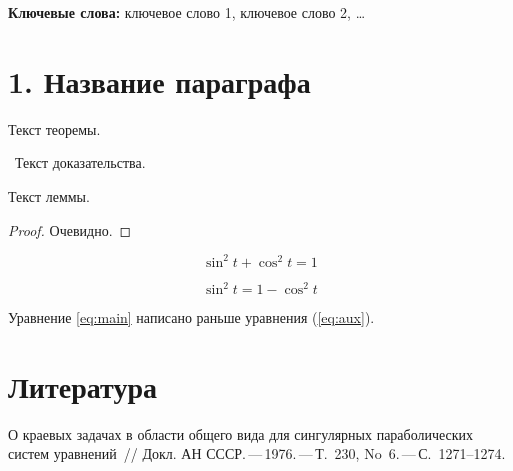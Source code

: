 










{\noindent\footnotesize{\bf Ключевые
 слова:} ключевое слово 1, ключевое слово 2, \ldots\par}



\section*{1. Название параграфа}



Текст теоремы. \Endproc

\beginproof~Текст доказательства.~\endproof


Текст леммы.\Endproc




\begin{proof}
Очевидно.
\end{proof}


\begin{equation}
	\label{eq:main}
	\sin^2 t + \cos^2 t = 1
\end{equation}

\begin{equation}
	\label{eq:aux}
	\sin^2 t = 1 - \cos^2 t
\end{equation}

Уравнение \eqref{eq:main} написано раньше уравнения (\ref{eq:aux}).










\section*{Литература}

\begin{enumerate}
 {\footnotesize
 \itemsep=0pt \parskip=0pt
 \leftskip=-10pt



  {О краевых задачах в области общего вида для сингулярных
 параболических систем уравнений~/\!/ Докл. АН СССР.\,---\,1976.\,---\,Т.~230, No~6.\,---\,С.~1271--1274.}




}
 \end{enumerate}

